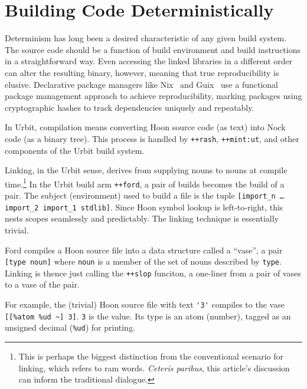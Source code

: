 \documentclass[twoside]{article}
\begin{document}
\section{Building Code Deterministically}

\sloppy
Determinism has long been a desired characteristic of any given build system.  The source code should be a function of build environment and build instructions in a straightforward way.  Even accessing the linked libraries in a different order can alter the resulting binary, however, meaning that true reproducibility is elusive.  Declarative package managers like Nix \citep{Nix}~and Guix \citep{Guix}~use a functional package management approach to achieve reproducibility, marking packages using cryptographic hashes to track dependencies uniquely and repeatably.

In Urbit, compilation means converting Hoon source code (as text) into Nock code (as a binary tree).  This process is handled by \lstinline[style=inlinecode]{++rash}, \lstinline[style=inlinecode]{++mint:ut}, and other components of the Urbit build system.

Linking, in the Urbit sense, derives from supplying nouns to nouns at compile time.\footnote{This is perhaps the biggest distinction from the conventional scenario for linking, which refers to {\sc ram} words.  \emph{Ceteris paribus}, this article's discussion can inform the traditional dialogue.}  In the Urbit build arm \lstinline[style=inlinecode]{++ford}, a pair of builds becomes the build of a pair.  The subject (environment) used to build a file is the tuple \lstinline[style=inlinecode]{[import_n … import_2 import_1 stdlib]}.  Since Hoon symbol lookup is left-to-right, this nests scopes seamlessly and predictably.  The linking technique is essentially trivial.

Ford compiles a Hoon source file into a data structure called a “vase”, a pair \lstinline[style=inlinecode]{[type noun]} where \lstinline[style=inlinecode]{noun} is a member of the set of nouns described by \lstinline[style=inlinecode]{type}.  Linking is thence just calling the \lstinline[style=inlinecode]{++slop} funciton, a one-liner from a pair of vases to a vase of the pair.

For example, the (trivial) Hoon source file with text \lstinline[style=inlinecode]{'3'} compiles to the vase \lstinline[style=inlinecode]{[[%atom %ud ~] 3]}.  \lstinline[style=inlinecode]{3} is the value.  Its type is an atom (number), tagged as an unsigned decimal (\lstinline[style=inlinecode]{%ud}) for printing.
\end{document}
